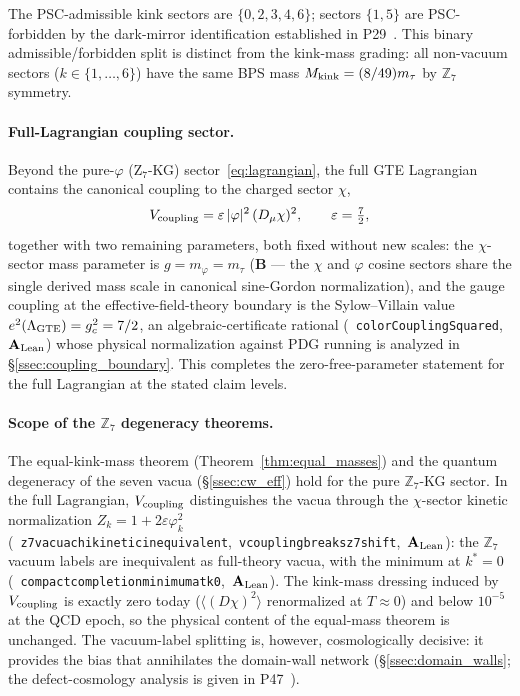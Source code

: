 \documentclass[11pt]{article}
\theoremstyle{remark}
\newcommand{\ZS}{\mathbb{Z}_7}
\newcommand{\lean}[1]{%
  \penalty-100
  \begingroup\def\_{\textunderscore\allowbreak}\texttt{#1}\endgroup}
\newcommand{\Mkink}{M_{\rm kink}}
\newcommand{\mtau}{m_\tau}
\newcommand{\CatAL}{\ensuremath{\textbf{A}_{\rm Lean}}}
\newcommand{\CatB}{\textbf{B}}
\begin{document}
The PSC-admissible kink sectors are $\{0,2,3,4,6\}$; sectors $\{1,5\}$ are PSC-forbidden by the dark-mirror identification established in P29~\cite{SpivackMirrorBraidAtlas}.  This binary admissible/forbidden split is distinct from the kink-mass grading: all non-vacuum sectors ($k\in\{1,\ldots,6\}$) have the same BPS mass $\Mkink = (8/49)\mtau$ by $\ZS$ symmetry.

\paragraph{Full-Lagrangian coupling sector.}
Beyond the pure-$\varphi$ (Z$_7$-KG) sector~\eqref{eq:lagrangian}, the full GTE
Lagrangian contains the canonical coupling to the charged sector $\chi$,
\begin{equation}
  V_{\rm coupling} = \varepsilon\,|\varphi|^2\,(D_\mu\chi)^2,
  \qquad \varepsilon = \tfrac{7}{2},
  \label{eq:vcoupling}
\end{equation}
together with two remaining parameters, both fixed without new scales:
the $\chi$-sector mass parameter is $g = m_\varphi = \mtau$ ($\CatB$ --- the
$\chi$ and $\varphi$ cosine sectors share the single derived mass scale in
canonical sine-Gordon normalization), and the gauge coupling at the
effective-field-theory boundary is the Sylow--Villain value
$e^2(\Lambda_{\rm GTE}) = g_c^2 = 7/2$, an algebraic-certificate rational
\mbox{(\lean{colorCouplingSquared}, $\CatAL$)} whose physical normalization
against PDG running is analyzed in \S\ref{ssec:coupling_boundary}.  This
completes the zero-free-parameter statement for the full Lagrangian at the
stated claim levels.

\paragraph{Scope of the $\ZS$ degeneracy theorems.}
The equal-kink-mass theorem (Theorem~\ref{thm:equal_masses}) and the
quantum degeneracy of the seven vacua (\S\ref{ssec:cw_eff}) hold for the pure
$\ZS$-KG sector.  In the full Lagrangian, $V_{\rm coupling}$ distinguishes
the vacua through the $\chi$-sector kinetic normalization
$Z_k = 1 + 2\varepsilon\varphi_k^2$ \mbox{(\lean{z7\_vacua\_chi\_kinetic\_inequivalent},
\lean{vcoupling\_breaks\_z7\_shift}, $\CatAL$)}: the $\ZS$ vacuum labels are
inequivalent as full-theory vacua, with the minimum at $k^\ast = 0$
\mbox{(\lean{compact\_completion\_minimum\_at\_k0}, $\CatAL$)}.  The kink-mass
dressing induced by $V_{\rm coupling}$ is exactly zero today
($\langle(D\chi)^2\rangle$ renormalized at $T\approx0$) and below $10^{-5}$
at the QCD epoch, so the physical content of the equal-mass theorem is
unchanged.  The vacuum-label splitting is, however, cosmologically decisive:
it provides the bias that annihilates the domain-wall network
(\S\ref{ssec:domain_walls}; the defect-cosmology analysis is given in
P47~\cite{SpivackGTECosmology}).
\end{document}
